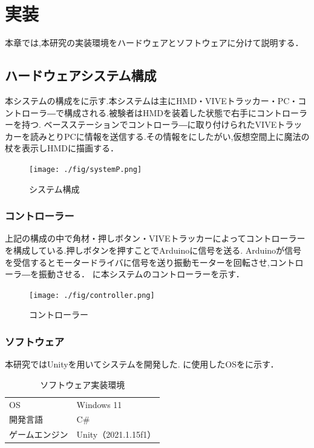 \chapter{実装}
本章では,本研究の実装環境をハードウェアとソフトウェアに分けて説明する．

\section{ハードウェアシステム構成}
本システムの構成をに示す.本システムは主にHMD・VIVEトラッカー・PC・コントローラ―で構成される.被験者はHMDを装着した状態で右手にコントローラーを持つ.
ベースステーションでコントローラ―に取り付けられたVIVEトラッカーを読みとりPCに情報を送信する.その情報をにしたがい,仮想空間上に魔法の杖を表示しHMDに描画する．

\begin{figure}[h]
\centering
\texttt{[image: ./fig/systemP.png]}
\caption{システム構成}\label{sys}
\end{figure}

\newpage

\subsection{コントローラー}
上記の構成の中で角材・押しボタン・VIVEトラッカーによってコントローラーを構成している.押しボタンを押すことでArduinoに信号を送る.
Arduinoが信号を受信するとモータードライバに信号を送り振動モーターを回転させ,コントローラ―を振動させる．
に本システムのコントローラーを示す．

\begin{figure}[h]
\centering
\texttt{[image: ./fig/controller.png]}
\caption{コントローラー}\label{controller}
\end{figure}






\subsection{ソフトウェア}
本研究ではUnityを用いてシステムを開発した.
に使用したOSをに示す．

\begin{table}[H]
    \caption{\label{tab;software}ソフトウェア実装環境}
    \centering
    \begin{tabular}{l|l}
    \hline
    \hline
    OS & Windows 11\\
    開発言語 & C\#\\
    ゲームエンジン & Unity（2021.1.15f1）\\
    \hline
    \end{tabular}
\end{table}

